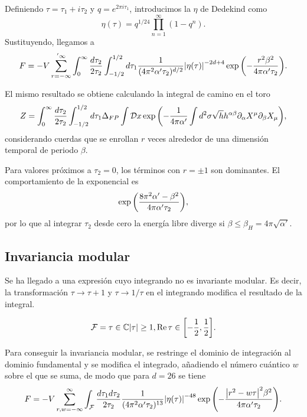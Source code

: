 Definiendo $\tau=\tau_1+i\tau_2$ y $q=e^{2\pi i\tau_1}$, introducimos la $\eta$ de 
Dedekind como
\begin{equation}
  \eta(\tau)=q^{1/24}\prod_{n=1}^{\infty} (1-q^n).
\end{equation}
Sustituyendo, llegamos a 
\begin{equation}
  F=-V \sum_{r=-\infty}^{'\infty} \int_0^\infty\frac{d\tau_2}{2\tau_2} \int_{-1/2}^{1/2} d\tau_1  \frac{1}{(4\pi^2\alpha'\tau_2)^{d/2}}
  \abs{\eta(\tau)}^{-2d+4}\exp\qty(-\frac{r^2\beta^2}{4\pi\alpha'\tau_2}).
  \label{eq:strip}
\end{equation}

El mismo resultado se obtiene calculando la integral de camino en el toro
\begin{equation}
  Z= \int_0^\infty\frac{d\tau_2}{2\tau_2} \int_{-1/2}^{1/2} d\tau_1 \Delta_{FP} \int \mathcal Dx
  \exp\qty(-\frac{1}{4\pi\alpha'}\int d^2\sigma \sqrt h h^{\alpha\beta}\partial_\alpha X^\mu \partial_\beta X_\mu),
\end{equation}
considerando cuerdas que se enrollan $r$ veces alrededor de una dimensión temporal de periodo $\beta$.

Para valores próximos a $\tau_2=0$, los términos con $r=\pm 1$ son dominantes.
El comportamiento de la exponencial es
\begin{equation}
  \exp\qty(\frac{8\pi^2 \alpha' -\beta^2}{4\pi\alpha'\tau_2}),
\end{equation}
por lo que al integrar $\tau_2$ desde cero la energía libre diverge si $\beta\leq \beta_H=4\pi\sqrt{\alpha'}$.

\subsection{Invariancia modular}
\label{sec:taq}
Se ha llegado a una expresión cuyo integrando no es invariante modular. Es decir, la 
transformación $\tau\to\tau+1$ y $\tau\to1/\tau$ en el integrando modifica el resultado
de la integral.

\begin{equation}
  \mathcal F = { \tau \in \mathbb{C} \abs{\tau} \geq 1, \Re\tau \in \qty[-\frac 1 2, \frac 1 2]}.
\end{equation}

Para conseguir la invariancia modular, se restringe el dominio de integración al dominio
fundamental y se modifica el integrado, añadiendo el número cuántico $w$ sobre el que 
se suma, de modo que para $d=26$ se tiene
\begin{equation}
  F=-V \sum_{r,w=-\infty}^{\infty} \int_\mathcal{F}  \frac{d\tau_1d\tau_2}{2\tau_2}   \frac{1}{(4\pi^2\alpha'\tau_2)^{13}}
  \abs{\eta(\tau)}^{-48}\exp\qty(-\frac{\abs{r^2-w\tau}^2\beta^2}{4\pi\alpha'\tau_2}).
  \label{eq:fund}
\end{equation}

